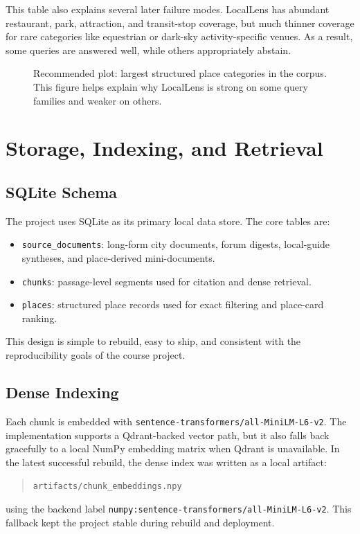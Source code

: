\documentclass[11pt]{article}
\begin{document}
This table also explains several later failure modes. LocalLens has abundant restaurant, park, attraction, and transit-stop coverage, but much thinner coverage for rare categories like equestrian or dark-sky activity-specific venues. As a result, some queries are answered well, while others appropriately abstain.

\begin{figure}[H]
\centering
{}
\caption{Recommended plot: largest structured place categories in the corpus. This figure helps explain why LocalLens is strong on some query families and weaker on others.}
\label{fig:place-category-plot}
\end{figure}

\section{Storage, Indexing, and Retrieval}
\subsection{SQLite Schema}
The project uses SQLite as its primary local data store. The core tables are:
\begin{itemize}[leftmargin=*]
    \item \texttt{source\_documents}: long-form city documents, forum digests, local-guide syntheses, and place-derived mini-documents.
    \item \texttt{chunks}: passage-level segments used for citation and dense retrieval.
    \item \texttt{places}: structured place records used for exact filtering and place-card ranking.
\end{itemize}

This design is simple to rebuild, easy to ship, and consistent with the reproducibility goals of the course project.

\subsection{Dense Indexing}
Each chunk is embedded with \texttt{sentence-transformers/all-MiniLM-L6-v2}. The implementation supports a Qdrant-backed vector path, but it also falls back gracefully to a local NumPy embedding matrix when Qdrant is unavailable. In the latest successful rebuild, the dense index was written as a local artifact:
\begin{quote}
\texttt{artifacts/chunk\_embeddings.npy}
\end{quote}
using the backend label \texttt{numpy:sentence-transformers/all-MiniLM-L6-v2}. This fallback kept the project stable during rebuild and deployment.
\end{document}
